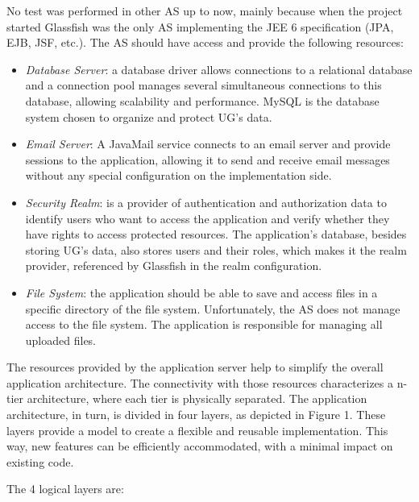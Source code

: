 \documentclass[envcountsame,envcountchap]{svmono}
\begin{document}
No test was performed in other AS up to now, mainly because when the project started Glassfish was the only AS implementing the JEE 6 specification (JPA, EJB, JSF, etc.). The AS should have access and provide the following resources:

\begin{itemize}
\item \textit{Database Server}: a database driver allows connections to a relational database and a connection pool manages several simultaneous connections to this database, allowing scalability and performance. MySQL is the database system chosen to organize and protect UG's data.

\item \textit{Email Server}: A JavaMail service connects to an email server and provide sessions to the application, allowing it to send and receive email messages without any special configuration on the implementation side.

\item \textit{Security Realm}: is a provider of authentication and authorization data to identify users who want to access the application and verify whether they have rights to access protected resources.  The application's database, besides storing UG's data, also stores users and their roles, which makes it the realm provider, referenced by Glassfish in the realm configuration.

\item \textit{File System}: the application should be able to save and access files in a specific directory of the file system. Unfortunately, the AS does not manage access to the file system. The application is responsible for managing all uploaded files.
\end{itemize}

The resources provided by the application server help to simplify the overall application architecture. The connectivity with those resources characterizes a n-tier architecture, where each tier is physically separated. The application architecture, in turn, is divided in four layers, as depicted in Figure 1. These layers provide a model to create a flexible and reusable implementation. This way, new features can be efficiently accommodated, with a minimal impact on existing code.

The 4 logical layers are:
\end{document}
